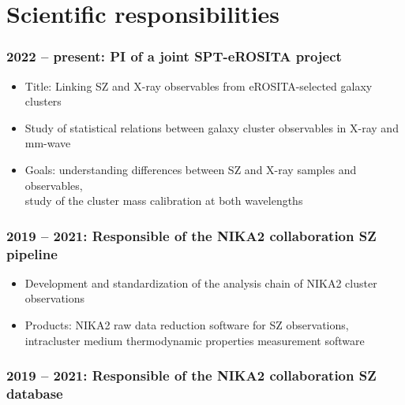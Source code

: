 \section{Scientific responsibilities}

\subsubsection{2022 -- present: PI of a joint SPT-eROSITA project}

\vspace{5pt}
\begin{itemize}
    \setlength{\itemsep}{0pt}
    \item Title: Linking SZ and X-ray observables from eROSITA-selected galaxy clusters
    \item Study of statistical relations between galaxy cluster observables in X-ray and mm-wave
    \item Goals: understanding differences between SZ and X-ray samples and observables, \\
          study of the cluster mass calibration at both wavelengths
\end{itemize} 

\subsubsection{2019 -- 2021: Responsible of the NIKA2 collaboration SZ pipeline}

\vspace{5pt}
\begin{itemize}
    \setlength{\itemsep}{0pt}
    \item Development and standardization of the analysis chain of NIKA2 cluster observations
    \item Products: NIKA2 raw data reduction software for SZ observations, \\ intracluster medium thermodynamic properties measurement software
\end{itemize} 
\subsubsection{2019 -- 2021: Responsible of the NIKA2 collaboration SZ database}
